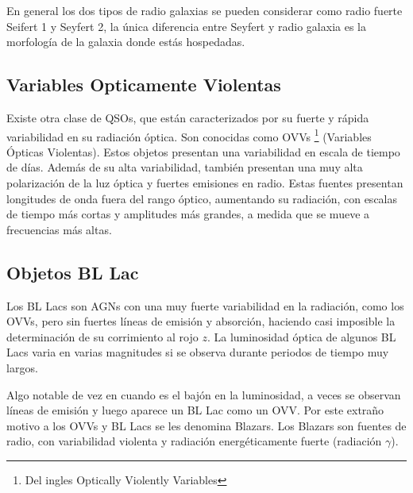 En general los dos tipos de radio galaxias se pueden considerar como radio fuerte Seifert 1 y Seyfert 2, la única diferencia entre Seyfert y radio galaxia es la morfología de la galaxia donde estás hospedadas. 

	\subsection{Variables Opticamente Violentas}
	\label{subsec:Optically_Violently_Variables}

Existe otra clase de QSOs, que están caracterizados por su fuerte y rápida variabilidad en su radiación óptica. Son conocidas como OVVs \footnote{Del ingles Optically Violently Variables } (Variables Ópticas Violentas). Estos objetos presentan una variabilidad en escala de tiempo de días. Además de su alta variabilidad, también presentan una muy alta polarización de la luz óptica y fuertes emisiones en radio. Estas fuentes presentan longitudes de onda fuera del rango óptico, aumentando su radiación, con escalas de tiempo más cortas y amplitudes más grandes, a medida que se mueve a frecuencias más altas.  

	\subsection{Objetos BL Lac}
	\label{subsec:BL_Lac}

Los BL Lacs son AGNs con una muy fuerte variabilidad en la radiación, como los OVVs, pero sin fuertes líneas de emisión y absorción, haciendo casi imposible la determinación de su corrimiento al rojo $z$. La luminosidad óptica de algunos BL Lacs varia en varias magnitudes si se observa durante periodos de tiempo muy largos.

Algo notable de vez en cuando es el bajón en la luminosidad, a veces se observan líneas de emisión y luego aparece un BL Lac como un OVV. Por este extraño motivo a los OVVs y BL Lacs se les denomina Blazars. Los Blazars son fuentes de radio, con variabilidad violenta y radiación energéticamente fuerte (radiación $\gamma$).



